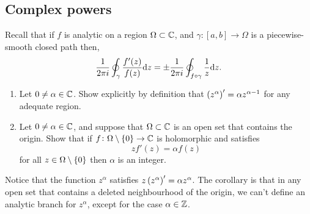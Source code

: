 \documentclass[11pt,a4paper]{article}
\begin{document}
\subsection{Complex powers}
\begin{exercise}
  Recall that if $f$ is analytic on a region $\Omega \subset \mathbb{C}$,
  and $\gamma \colon [a,b] \to \Omega$ is a piecewise-smooth closed path then,
  \[
    \frac{1}{2 \pi i} \oint_{\gamma} \frac{f'(z)}{f(z)} \mathrm{d} z =
    \pm \frac{1}{2 \pi i} \oint_{f \circ \gamma} \frac{1}{z} \mathrm{d} z.
  \]
  \begin{enumerate}
    \item[(1)] Let $0 \neq \alpha \in \mathbb{C}$.
      Show explicitly by definition that
      $\del{z^{\alpha}}' = \alpha z^{\alpha - 1}$ for any adequate region.
    \item[(2)] Let $0 \neq \alpha \in \mathbb{C}$, and suppose that $\Omega \subset \mathbb{C}$
      is an open set that contains the origin.
      Show that if $f \colon \Omega \setminus \left\{0\right\} \to \mathbb{C}$ is
      holomorphic and satisfies
      \[
        z f'(z) = \alpha f(z)
      \]
      for all $z \in \Omega \setminus \left\{0\right\}$ then $\alpha$ is an integer.
  \end{enumerate}
  Notice that the function $z^{\alpha}$ satisfies
  $z \del{z^{\alpha}}' = \alpha z^{\alpha}$.
  The corollary is that in any open set that contains a deleted neighbourhood
  of the origin, we can't define an analytic branch for $z^{\alpha}$,
  except for the case $\alpha \in \mathbb{Z}$.
\end{exercise}
\end{document}
